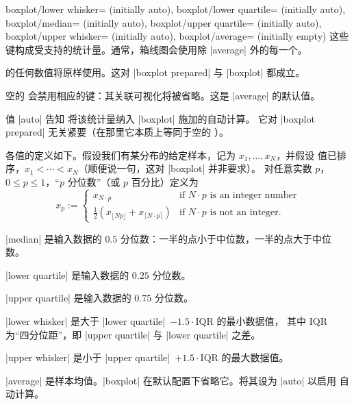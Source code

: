 \begin{pgfplotskeylist}{%
    boxplot/lower whisker= (initially auto),
    boxplot/lower quartile= (initially auto),
    boxplot/median= (initially auto),
    boxplot/upper quartile= (initially auto),
    boxplot/upper whisker= (initially auto),
    boxplot/average= (initially empty)%
}
    这些键构成受支持的统计量。通常，箱线图会使用除 |average| 外的每一个。

     的任何数值将原样使用。这对 |boxplot prepared| 与 |boxplot|
    都成立。

    空的  会禁用相应的键：其关联可视化将被省略。这是 |average|
    的默认值。

    值 |auto| 告知 \PGFPlots{} 将该统计量纳入 |boxplot| 施加的自动计算。
    它对 |boxplot prepared| 无关紧要（在那里它本质上等同于空的 ）。

    各值的定义如下。假设我们有某分布的给定样本，记为 $x_1,\dotsc,x_N$，并假设
    值已排序，$x_1 < \dotsb < x_N$（顺便说一句，这对 |boxplot| 并非要求）。
    对任意实数 $p$，$0\le p\le1$，“$p$ 分位数”（或 $p$ 百分比）定义为
        \[
            x_p :=
                \begin{cases}
                     x_{N \cdot p}
                        & \text{if $N \cdot p$ is an integer number}\\
                    \frac{1}{2} (x_{\lfloor N p \rfloor} + x_{\lceil N \cdot p \rceil})
                        & \text{if $N \cdot p$ is not an integer.}
                \end{cases}
        \]

    |median| 是输入数据的 $0.5$ 分位数：一半的点小于中位数，一半的点大于中位数。

    |lower quartile| 是输入数据的 $0.25$ 分位数。

    |upper quartile| 是输入数据的 $0.75$ 分位数。

    |lower whisker| 是大于 |lower quartile|~$-1.5 \cdot \text{IQR}$ 的最小数据值，
    其中 $\text{IQR}$ 为“四分位距”，即 |upper quartile| 与 |lower quartile| 之差。

    |upper whisker| 是小于 |upper quartile|~$+1.5 \cdot \text{IQR}$ 的最大数据值。

    |average| 是样本均值。|boxplot| 在默认配置下省略它。将其设为 |auto| 以启用
    自动计算。
\end{pgfplotskeylist}

